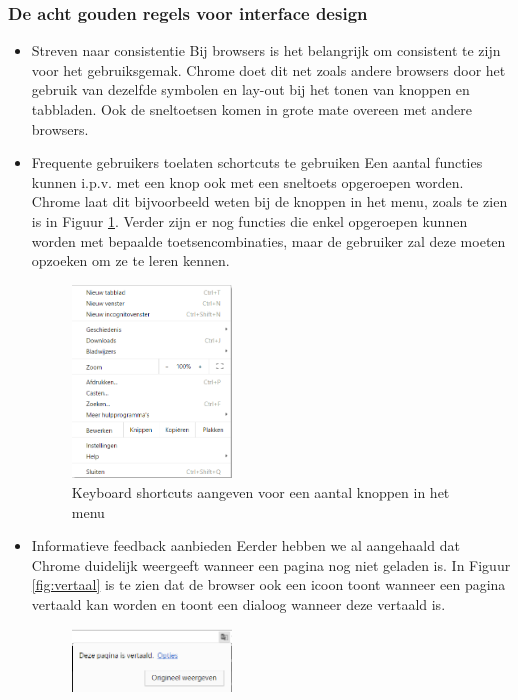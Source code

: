 \documentclass[12pt]{article}
\begin{document}
\subsubsection{De acht gouden regels voor interface design}
\begin{itemize}
	\item Streven naar consistentie
	\newline
	Bij browsers is het belangrijk om consistent te zijn voor het gebruiksgemak. Chrome doet dit net zoals andere browsers door het gebruik van dezelfde symbolen en lay-out bij het tonen van knoppen en tabbladen. Ook de sneltoetsen komen in grote mate overeen met andere browsers.
	\item Frequente gebruikers toelaten schortcuts te gebruiken
	\newline
	Een aantal functies kunnen i.p.v. met een knop ook met een sneltoets opgeroepen worden. Chrome laat dit bijvoorbeeld weten bij de knoppen in het menu, zoals te zien is in Figuur \ref{fig:shortcuts}. Verder zijn er nog functies die enkel opgeroepen kunnen worden met bepaalde toetsencombinaties, maar de gebruiker zal deze moeten opzoeken om ze te leren kennen.
	\begin{figure}
		\centering
		\includegraphics[width=0.4\textwidth]{imgShortcuts.png}
		\caption{Keyboard shortcuts aangeven voor een aantal knoppen in het menu}
		\label{fig:shortcuts}
	\end{figure}
	\item Informatieve feedback aanbieden
	\newline
	Eerder hebben we al aangehaald dat Chrome duidelijk weergeeft wanneer een pagina nog niet geladen is. In Figuur \ref{fig:vertaal} is te zien dat de browser ook een icoon toont wanneer een pagina vertaald kan worden en toont een dialoog wanneer deze vertaald is.
	\begin{figure}
		\centering
		\includegraphics[width=0.4\textwidth]{imgVertaal.png}

\end{figure}
\end{itemize}
\end{document}
